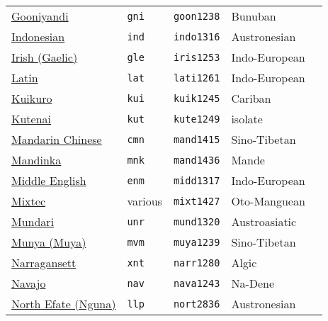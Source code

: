 \begin{longtable}[c]{ l l l l l }
  \href{https://glottolog.org/resource/languoid/id/goon1238}{Gooniyandi}             & \texttt{gni}       & \texttt{goon1238}   & Bunuban\\
  \href{https://glottolog.org/resource/languoid/id/indo1316}{Indonesian}             & \texttt{ind}       & \texttt{indo1316}   & Austronesian\\
  \href{https://glottolog.org/resource/languoid/id/iris1253}{Irish (Gaelic)}         & \texttt{gle}       & \texttt{iris1253}   & Indo-European\\
  \href{https://glottolog.org/resource/languoid/id/lati1261}{Latin}                  & \texttt{lat}       & \texttt{lati1261}   & Indo-European\\
  \href{https://glottolog.org/resource/languoid/id/kuik1245}{Kuikuro}                & \texttt{kui}       & \texttt{kuik1245}   & Cariban\\
  \href{https://glottolog.org/resource/languoid/id/kute1249}{Kutenai}                & \texttt{kut}       & \texttt{kute1249}   & isolate\\
  \href{https://glottolog.org/resource/languoid/id/mand1415}{Mandarin Chinese}       & \texttt{cmn}       & \texttt{mand1415}   & Sino-Tibetan\\
  \href{https://glottolog.org/resource/languoid/id/mand1436}{Mandinka}               & \texttt{mnk}       & \texttt{mand1436}   & Mande\\
  \href{https://glottolog.org/resource/languoid/id/midd1317}{Middle English}         & \texttt{enm}       & \texttt{midd1317}   & Indo-European\\
  \href{https://glottolog.org/resource/languoid/id/mixt1427}{Mixtec}                 & various            & \texttt{mixt1427}   & Oto-Manguean\\
  \href{https://glottolog.org/resource/languoid/id/mund1320}{Mundari}                & \texttt{unr}       & \texttt{mund1320}   & Austroasiatic\\
  \href{https://glottolog.org/resource/languoid/id/muya1239}{Munya (Muya)}           & \texttt{mvm}       & \texttt{muya1239}   & Sino-Tibetan\\
  \href{https://glottolog.org/resource/languoid/id/narr1280}{Narragansett}           & \texttt{xnt}       & \texttt{narr1280}   & Algic\\
  \href{https://glottolog.org/resource/languoid/id/nava1243}{Navajo}                 & \texttt{nav}       & \texttt{nava1243}   & Na-Dene\\
  \href{https://glottolog.org/resource/languoid/id/nort2836}{North Efate (Nguna)}    & \texttt{llp}       & \texttt{nort2836}   & Austronesian\\

\end{longtable}

